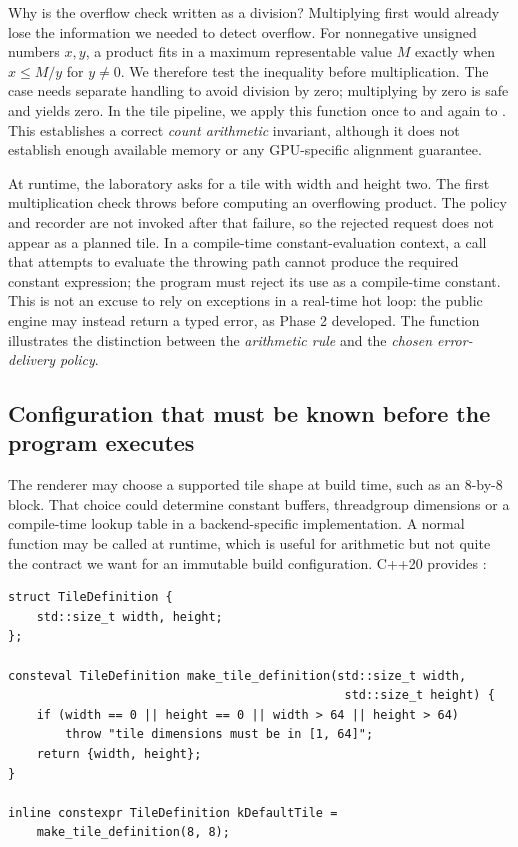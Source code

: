 Why is the overflow check written as a division? Multiplying first would already lose the information we needed to detect overflow. For nonnegative unsigned numbers \(x,y\), a product fits in a maximum representable value \(M\) exactly when \(x\le M/y\) for \(y\ne0\). We therefore test the inequality before multiplication. The  case needs separate handling to avoid division by zero; multiplying by zero is safe and yields zero. In the tile pipeline, we apply this function once to  and again to . This establishes a correct \emph{count arithmetic} invariant, although it does not establish enough available memory or any GPU-specific alignment guarantee.

At runtime, the laboratory asks for a tile with width  and height two. The first multiplication check throws before computing an overflowing product. The policy and recorder are not invoked after that failure, so the rejected request does not appear as a planned tile. In a compile-time constant-evaluation context, a call that attempts to evaluate the throwing path cannot produce the required constant expression; the program must reject its use as a compile-time constant. This is not an excuse to rely on exceptions in a real-time hot loop: the public engine may instead return a typed error, as Phase 2 developed. The function illustrates the distinction between the \emph{arithmetic rule} and the \emph{chosen error-delivery policy}.

\subsection{Configuration that must be known before the program executes}\label{01-foundations-i-ch005-configuration-that-must-be-known-before-the-program-executes}

\hypertarget{01-foundations-i-ch005-configuration-that-must-be-known-before-the-program-executes}{}

The renderer may choose a supported tile shape at build time, such as an 8-by-8 block. That choice could determine constant buffers, threadgroup dimensions or a compile-time lookup table in a backend-specific implementation. A normal  function may be called at runtime, which is useful for arithmetic but not quite the contract we want for an immutable build configuration. C++20 provides :

\begin{verbatim}
struct TileDefinition {
    std::size_t width, height;
};

consteval TileDefinition make_tile_definition(std::size_t width,
                                               std::size_t height) {
    if (width == 0 || height == 0 || width > 64 || height > 64)
        throw "tile dimensions must be in [1, 64]";
    return {width, height};
}

inline constexpr TileDefinition kDefaultTile =
    make_tile_definition(8, 8);
\end{verbatim}

